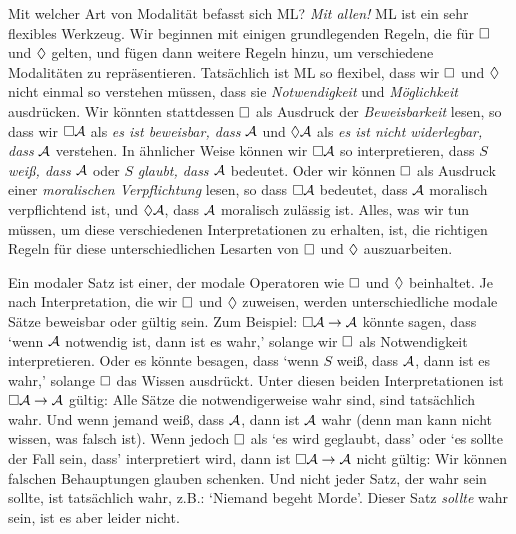 Mit welcher Art von Modalität befasst sich ML? \emph{Mit allen!} ML ist ein sehr flexibles Werkzeug. Wir beginnen mit einigen grundlegenden Regeln, die für $\Box$ und $\Diamond$ gelten, und fügen dann weitere Regeln hinzu, um verschiedene Modalitäten zu repräsentieren. Tatsächlich ist ML so flexibel, dass wir $\Box$ und $\Diamond$ nicht einmal so verstehen müssen, dass sie \emph{Notwendigkeit} und \emph{Möglichkeit} ausdrücken. Wir könnten stattdessen $\Box$ als Ausdruck der \emph{Beweisbarkeit} lesen, so dass wir $\Box\mathcal{A}$ als \emph{es ist beweisbar, dass} $\mathcal{A}$ und $\Diamond\mathcal{A}$ als \emph{es ist nicht widerlegbar, dass} $\mathcal{A}$ verstehen. In ähnlicher Weise können wir $\Box\mathcal{A}$ so interpretieren, dass $S$ \emph{wei{\ss}, dass $\mathcal{A}$} oder $S$ \emph{glaubt, dass $\mathcal{A}$} bedeutet. Oder wir können $\Box$ als Ausdruck einer \emph{moralischen Verpflichtung} lesen, so dass $\Box \mathcal{A}$ bedeutet, dass $\mathcal{A}$ moralisch verpflichtend ist, und $\Diamond \mathcal{A}$, dass $\mathcal{A}$ moralisch zulässig ist. Alles, was wir tun müssen, um diese verschiedenen Interpretationen zu erhalten, ist, die richtigen Regeln für diese unterschiedlichen Lesarten von $\Box$ und $\Diamond$ auszuarbeiten.

Ein modaler Satz ist einer, der modale Operatoren wie $\Box$ und $\Diamond$ beinhaltet. Je nach Interpretation, die wir $\Box$ und $\Diamond$ zuweisen, werden unterschiedliche modale Sätze beweisbar oder gültig sein. Zum Beispiel: $\Box \mathcal{A} \rightarrow \mathcal{A}$ könnte sagen, dass `wenn $\mathcal{A}$ notwendig ist, dann ist es wahr,' solange wir $\Box$ als Notwendigkeit interpretieren. Oder es könnte besagen, dass `wenn $S$ wei{\ss}, dass $\mathcal{A}$, dann ist es wahr,' solange $\Box$ das Wissen ausdrückt. Unter diesen beiden Interpretationen ist $\Box\mathcal{A} \rightarrow \mathcal{A}$ gültig: Alle Sätze die notwendigerweise wahr sind, sind tatsächlich wahr. Und wenn jemand wei{\ss}, dass $\mathcal{A}$, dann ist $\mathcal{A}$ wahr (denn man kann nicht wissen, was falsch ist). Wenn jedoch $\Box$ als `es wird geglaubt, dass' oder `es sollte der Fall sein, dass' interpretiert wird, dann ist $\Box\mathcal{A} \rightarrow \mathcal{A}$ nicht gültig: Wir können falschen Behauptungen glauben schenken. Und nicht jeder Satz, der wahr sein sollte, ist tatsächlich wahr, z.B.\@: `Niemand begeht Morde'. Dieser Satz \emph{sollte} wahr sein, ist es aber leider nicht. 

